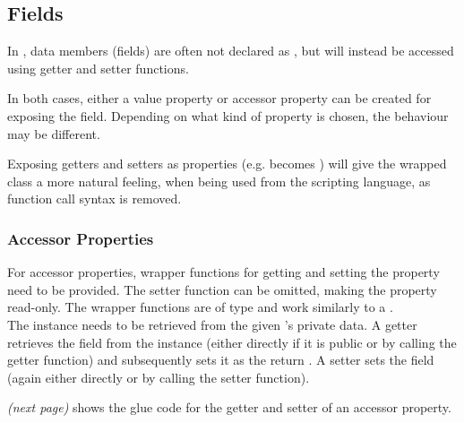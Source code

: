\subsection{Fields}
\label{sec:Fields}

In , data members (fields) are often not declared as , but will instead be accessed using getter and setter functions.

In both cases, either a  value property or accessor property can be created for exposing the field. Depending on what kind of property is chosen, the behaviour may be different.

Exposing getters and setters as properties (e.g.  becomes ) will give the wrapped class a more natural feeling, when being used from the scripting language, as function call syntax is removed.


\subsubsection{Accessor Properties}

For accessor properties, wrapper functions for getting and setting the property need to be provided. The setter function can be omitted, making the property read-only. The wrapper functions are of type  and work similarly to a .\\
The  instance needs to be retrieved from the given 's private data. A getter  retrieves the field from the instance (either directly if it is public or by calling the  getter function) and subsequently sets it as the return . A setter  sets the field (again either directly or by calling the  setter function).

 \textit{(next page)} shows the glue code for the getter and setter of an accessor property.

